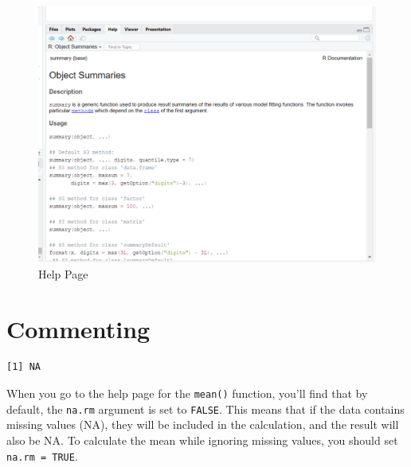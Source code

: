 \documentclass[
  letterpaper,
  DIV=11,
  numbers=noendperiod]{scrreprt}
\newenvironment{Shaded}{\begin{snugshade}}{\end{snugshade}}
\newcommand{\AttributeTok}[1]{\textcolor[rgb]{0.40,0.45,0.13}{#1}}
\newcommand{\CommentTok}[1]{\textcolor[rgb]{0.37,0.37,0.37}{#1}}
\newcommand{\ConstantTok}[1]{\textcolor[rgb]{0.56,0.35,0.01}{#1}}
\newcommand{\FunctionTok}[1]{\textcolor[rgb]{0.28,0.35,0.67}{#1}}
\newcommand{\NormalTok}[1]{\textcolor[rgb]{0.00,0.23,0.31}{#1}}
\newcommand{\SpecialCharTok}[1]{\textcolor[rgb]{0.37,0.37,0.37}{#1}}
\begin{document}
\begin{figure}[H]

{\centering \includegraphics[width=1\textwidth,height=\textheight]{fig/5_summaryhelp.png}

}

\caption{Help Page}

\end{figure}%

\section{Commenting}\label{commenting}

\begin{Shaded}
\end{Shaded}

\begin{verbatim}
[1] NA
\end{verbatim}

When you go to the help page for the \texttt{mean()} function, you'll
find that by default, the \texttt{na.rm} argument is set to
\texttt{FALSE}. This means that if the data contains missing values
(NA), they will be included in the calculation, and the result will also
be NA. To calculate the mean while ignoring missing values, you should
set \texttt{na.rm\ =\ TRUE}.

\begin{Shaded}
\end{Shaded}
\end{document}
